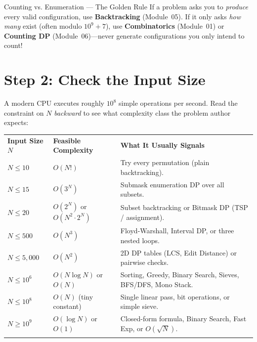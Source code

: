 \documentclass[11pt,a4paper]{article}
\begin{document}
\begin{calloutbox}{Counting vs. Enumeration --- The Golden Rule}
If a problem asks you to \emph{produce} every valid configuration, use \textbf{Backtracking} (Module~05). If it only asks \emph{how many} exist (often modulo $10^9 + 7$), use \textbf{Combinatorics} (Module~01) or \textbf{Counting DP} (Module~06)---never generate configurations you only intend to count!
\end{calloutbox}

\section{Step 2: Check the Input Size}
\label{sec:size}

A modern CPU executes roughly $10^8$ simple operations per second. Read the constraint on $N$ \emph{backward} to see what complexity class the problem author expects:

\begingroup\small{}
\begin{tabularx}{\textwidth}{>{\raggedright\arraybackslash\bfseries}p{2.7cm} >{\raggedright\arraybackslash}p{3.4cm} >{\raggedright\arraybackslash}X}
\arrayrulecolor{primaryblue}\toprule[1.2pt]
\rowcolor{primaryblue!10}
\textcolor{primaryblue}{\textbf{Input Size $N$}} & \textcolor{primaryblue}{\textbf{Feasible Complexity}} & \textcolor{primaryblue}{\textbf{What It Usually Signals}} \\
\arrayrulecolor{codeframe}\midrule[0.6pt]
$N \le 10$ & $O(N!)$ & Try every permutation (plain backtracking). \\
$N \le 15$ & $O(3^N)$ & Submask enumeration DP over all subsets. \\
$N \le 20$ & $O(2^N)$ or $O(N^2 \cdot 2^N)$ & Subset backtracking or Bitmask DP (TSP / assignment). \\
$N \le 500$ & $O(N^3)$ & Floyd-Warshall, Interval DP, or three nested loops. \\
$N \le 5{,}000$ & $O(N^2)$ & 2D DP tables (LCS, Edit Distance) or pairwise checks. \\
$N \le 10^6$ & $O(N \log N)$ or $O(N)$ & Sorting, Greedy, Binary Search, Sieves, BFS/DFS, Mono Stack. \\
$N \le 10^8$ & $O(N)$ (tiny constant) & Single linear pass, bit operations, or simple sieve. \\
$N \ge 10^9$ & $O(\log N)$ or $O(1)$ & Closed-form formula, Binary Search, Fast Exp, or $O(\sqrt{N})$. \\
\arrayrulecolor{primaryblue}\bottomrule[1.2pt]
\end{tabularx}\endgroup
\end{document}
